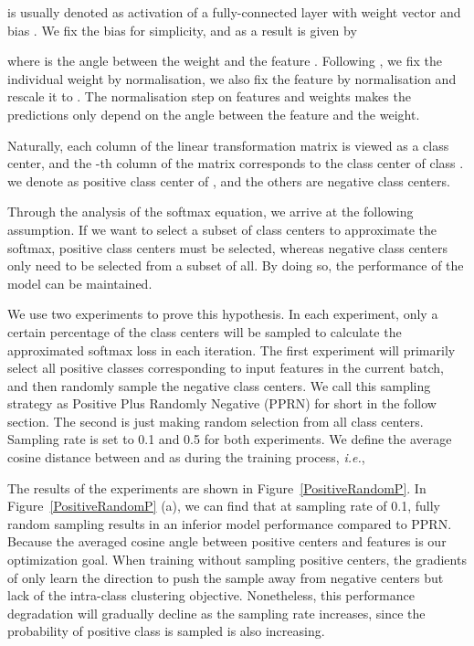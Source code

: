 \documentclass[letterpaper]{article} \usepackage{style/aaai21}  \usepackage{times}  \usepackage{helvet} \usepackage{courier}  \usepackage[hyphens]{url}  \usepackage{graphicx} \usepackage{color}
\begin{document}
 is usually denoted as activation of a fully-connected layer with weight vector  and bias . We fix the bias  for simplicity, and as a result   is given by 
 
where  is the angle between the weight  and the feature . Following \cite{wang2018cosface,liu2017sphereface,deng2019arcface,wang2018additive}, we
fix the individual weight  by  normalisation, we also fix the feature  by  normalisation
and rescale it to .  The normalisation step on features and weights makes the predictions only depend on the angle between the feature and the weight.

Naturally, each column of the linear transformation matrix is viewed as a class center, and the -th column of the matrix corresponds to the class center of class . we denote  as positive class center of , and the others are negative class centers. 

Through the analysis of the softmax equation, we arrive at the following assumption. If we want to select a subset of class centers to approximate the softmax, positive class centers must be selected, whereas negative class centers only need to be selected from a subset of all. By doing so, the performance of the model can be maintained.

We use two experiments to prove this hypothesis. In each experiment, only a certain percentage of the class centers will be sampled to calculate the approximated softmax loss in each iteration.
The first experiment will primarily select all positive classes corresponding to input features in the current batch, and then randomly sample the negative class centers. We call this sampling strategy as Positive Plus Randomly Negative (PPRN) for short in the follow section. The second is just making random selection from all class centers. Sampling rate is set to 0.1 and 0.5 for both experiments. We define the average cosine distance between  and  as  during the training process, \emph{i.e.}, 


The results of the experiments are shown in Figure~\ref{PositiveRandomP}. In Figure~\ref{PositiveRandomP} (a), we can find that at sampling rate of 0.1, fully random sampling results in an inferior model performance compared to PPRN. Because the averaged cosine angle between positive centers and features is our optimization goal. When training without sampling positive centers, the gradients of  only learn the direction to push the sample away from negative centers but lack of the intra-class 
clustering objective. Nonetheless, this performance degradation will gradually decline as the sampling rate increases, since the probability of positive class is sampled is also increasing.
\end{document}
